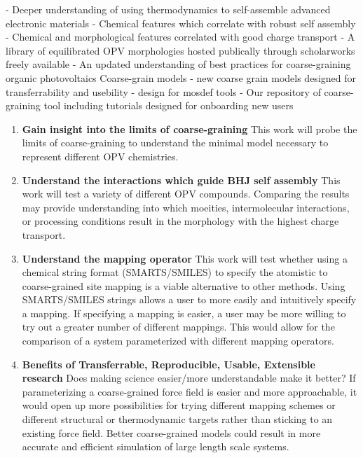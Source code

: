 - Deeper understanding of using thermodynamics to self-assemble advanced electronic materials
- Chemical features which correlate with robust self assembly
- Chemical and morphological features correlated with good charge transport
- A library of equilibrated OPV morphologies hosted publically through scholarworks freely available
- An updated understanding of best practices for coarse-graining organic photovoltaics Coarse-grain models
- new coarse grain models designed for transferrability and usebility - design for mosdef tools
- Our repository of coarse-graining tool including tutorials designed for onboarding new users
\begin{enumerate}
    \item {\textbf{Gain insight into the limits of coarse-graining}}
        This work will probe the limits of coarse-graining to understand the minimal model necessary to represent different OPV chemistries.
    \item {\textbf{Understand the interactions which guide BHJ self assembly}} 
        This work will test a variety of different OPV compounds. 
        Comparing the results may provide understanding into which moeities, intermolecular interactions, or processing conditions result in the morphology with the highest charge transport.
    \item {\textbf{Understand the mapping operator}}
        This work will test whether using a chemical string format (SMARTS/SMILES) to specify the atomistic to coarse-grained site mapping is a viable alternative to other methods. 
        Using SMARTS/SMILES strings allows a user to more easily and intuitively specify a mapping.
        If specifying a mapping is easier, a user may be more willing to try out a greater number of different mappings.
        This would allow for the comparison of a system parameterized with different mapping operators.
    \item {\textbf{Benefits of Transferrable, Reproducible, Usable, Extensible research}} %
        Does making science easier/more understandable make it better? %
        If parameterizing a coarse-grained force field is easier and more approachable, it would open up more possibilities for trying different mapping schemes or different structural or thermodynamic targets rather than sticking to an existing force field.
        Better coarse-grained models could result in more accurate and efficient simulation of large length scale systems.
\end{enumerate}

